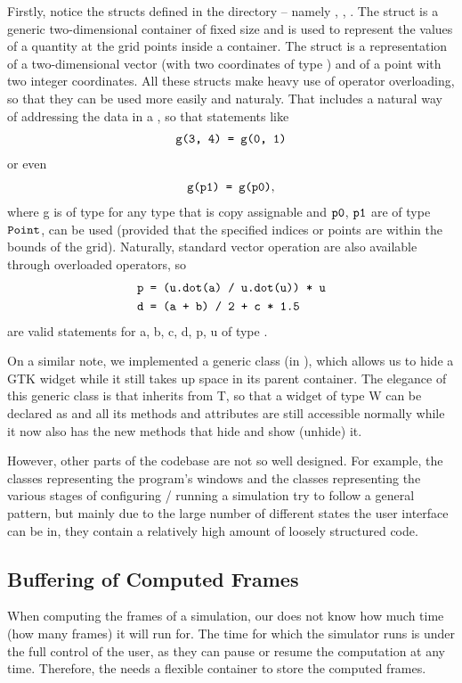 \documentclass[11pt,a4paper,twoside,openright]{report}
\begin{document}
Firstly, notice the structs defined in the  directory -- namely , , . The  struct is a generic two-dimensional container of fixed size and is used to represent the values of a quantity at the grid points inside a container. The  struct is a representation of a two-dimensional vector (with two coordinates of type ) and  of a point with two integer coordinates. All these structs make heavy use of operator overloading, so that they can be used more easily and naturaly. That includes a natural way of addressing the data in a , so that statements like
\begin{align*}
	\texttt{g(3, 4) = g(0, 1)}
\end{align*}
or even
\begin{align*}
	\texttt{g(p1) = g(p0)},
\end{align*}
where \icd g is of type  for any type  that is copy assignable and $\texttt{p0}$, $\texttt{p1}$ are of type $\texttt{Point}$, can be used (provided that the specified indices or points are within the bounds of the grid). Naturally, standard vector operation are also available through overloaded operators, so
\begin{align*}
	&\texttt{p = (u.dot(a) / u.dot(u)) * u}\\
	&\texttt{d = (a + b) / 2 + c * 1.5}
\end{align*}
are valid statements for \icd a, \icd b, \icd c, \icd d, \icd p, \icd u of type .

On a similar note, we implemented a generic class  (in ), which allows us to hide a GTK widget while it still takes up space in its parent container. The elegance of this generic class is that  inherits from \icd T, so that a widget of type \icd W can be declared as  and all its methods and attributes are still accessible normally while it now also has the new methods that hide and show (unhide) it.

However, other parts of the codebase are not so well designed. For example, the classes representing the program's windows and the classes representing the various stages of configuring / running a simulation try to follow a general pattern, but mainly due to the large number of different states the user interface can be in, they contain a relatively high amount of loosely structured code.

\subsection{Buffering of Computed Frames}
When computing the frames of a simulation, our \software{} does not know how much time (how many frames) it will run for. The time for which the simulator runs is under the full control of the user, as they can pause or resume the computation at any time. Therefore, the \software{} needs a flexible container to store the computed frames.
\end{document}
